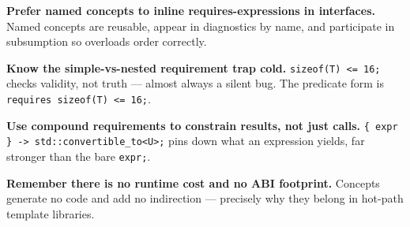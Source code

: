 \textbf{Prefer named concepts to inline requires-expressions in interfaces.} Named concepts are reusable, appear in diagnostics by name, and participate in subsumption so overloads order correctly.

\textbf{Know the simple-vs-nested requirement trap cold.} \texttt{sizeof(T) <= 16;} checks validity, not truth --- almost always a silent bug. The predicate form is \texttt{requires sizeof(T) <= 16;}.

\textbf{Use compound requirements to constrain results, not just calls.} \texttt{\{ expr \} -> std::convertible\_to<U>;} pins down what an expression yields, far stronger than the bare \texttt{expr;}.

\textbf{Remember there is no runtime cost and no ABI footprint.} Concepts generate no code and add no indirection --- precisely why they belong in hot-path template libraries.
